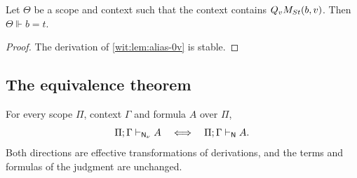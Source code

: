 \begin{lemma}
\label{wit:lem:alias}
Let $\Theta$ be a scope and context such that the context contains
$Q_{v}M_{S t}(b,v)$.  Then $\Theta\Vdash b=t$.
\end{lemma}

\begin{proof}
The derivation of \cref{wit:lem:alias-0v} is stable.
\end{proof}

\subsection{The equivalence theorem}

\begin{theorem}
\label{wit:thm:newest}
For every scope $\Pi$, context $\Gamma$ and formula $A$ over $\Pi$,
\[
 \Pi;\Gamma\vdash_{\mathsf{N}_{\nu}}A
 \quad\Longleftrightarrow\quad
 \Pi;\Gamma\vdash_{\mathsf{N}}A .
\]
Both directions are effective transformations of derivations, and the terms
and formulas of the judgment are unchanged.
\end{theorem}

